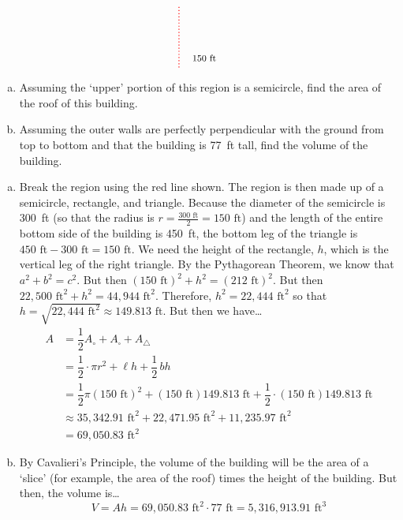 \documentclass[12pt,letterpaper]{exam}
\begin{document}
\begin{questions}
\[\begin{tikzpicture}
	\draw[line width=0.03cm,dotted,red] (4,0) -- (4,2);
	\node at (4.8,0.3) {\footnotesize 150 ft};
	\end{tikzpicture}
	\]
	
\begin{enumerate}[(a)]
\item Assuming the `upper' portion of this region is a semicircle, find the area of the roof of this building.
\item Assuming the outer walls are perfectly perpendicular with the ground from top to bottom and that the building is 77~ft tall, find the volume of the building. 
\end{enumerate} \pspace

\sol 
\begin{enumerate}[(a)]
\item Break the region using the red line shown. The region is then made up of a semicircle, rectangle, and triangle. Because the diameter of the semicircle is 300~ft (so that the radius is $r= \frac{300 \text{ ft}}{2}= 150 \text{ ft}$) and the length of the entire bottom side of the building is 450~ft, the bottom leg of the triangle is $450 \text{ ft} - 300 \text{ ft}= 150 \text{ ft}$. We need the height of the rectangle, $h$, which is the vertical leg of the right triangle. By the Pythagorean Theorem, we know that $a^2 + b^2= c^2$. But then $(150 \text{ ft})^2 + h^2= (212 \text{ ft})^2$. But then $22,\!500 \text{ ft}^2 + h^2= 44,\!944 \text{ ft}^2$. Therefore, $h^2= 22,\!444 \text{ ft}^2$ so that $h= \sqrt{22,\!444 \text{ ft}^2} \approx 149.813 \text{ ft}$. But then we have\dots
	\[
	\begin{aligned}
	A&= \dfrac{1}{2} A_{\circ} + A_{\square} + A_{\triangle} \\[0.3cm]
	&= \dfrac{1}{2} \cdot \pi r^2 + \ell h + \dfrac{1}{2} \, b h \\[0.3cm]
	&= \dfrac{1}{2} \pi (150 \text{ ft})^2 + (150 \text{ ft}) 149.813 \text{ ft} + \dfrac{1}{2} \cdot (150 \text{ ft}) 149.813 \text{ ft} \\[0.3cm]
	&\approx 35,\!342.91 \text{ ft}^2 + 22,\!471.95 \text{ ft}^2 + 11,\!235.97 \text{ ft}^2 \\[0.3cm]
	&= 69,\!050.83 \text{ ft}^2
	\end{aligned}
	\]

\item By Cavalieri's Principle, the volume of the building will be the area of a `slice' (for example, the area of the roof) times the height of the building. But then, the volume is\dots
	\[
	V= Ah= 69,\!050.83 \text{ ft}^2 \cdot 77 \text{ ft}= 5,\!316,\!913.91 \text{ ft}^3
	\]
\end{enumerate}


\end{questions}
\end{document}
